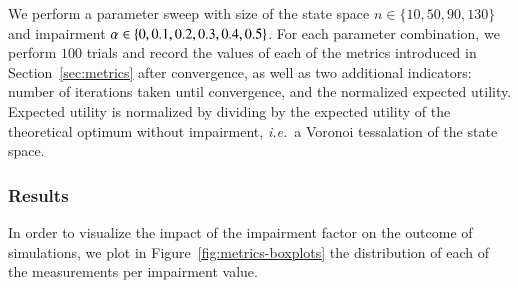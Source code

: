 We perform a parameter sweep with size of the state space $n \in \{10,
50, 90, 130\}$ and impairment $\alpha \in \{0, 0.1, 0.2, 0.3,
0.4, 0.5\}$.
For each parameter combination, we perform $100$ trials and record the values of each of the metrics introduced in Section~\ref{sec:metrics} after convergence, as well as two additional indicators: number of iterations taken until convergence, and the normalized expected utility.
Expected utility is normalized by dividing by the expected utility of the theoretical optimum without impairment, \emph{i.e.}~a Voronoi tessalation of the state space. 

\subsubsection{Results}
In order to visualize the impact of the impairment factor on the outcome of simulations, we plot in Figure~\ref{fig:metrics-boxplots} the distribution of each of the measurements per impairment value.
%
